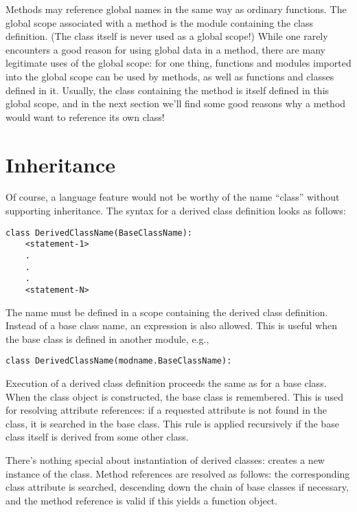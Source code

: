 \documentclass{manual}
\begin{document}
Methods may reference global names in the same way as ordinary
functions.  The global scope associated with a method is the module
containing the class definition.  (The class itself is never used as a
global scope!)  While one rarely encounters a good reason for using
global data in a method, there are many legitimate uses of the global
scope: for one thing, functions and modules imported into the global
scope can be used by methods, as well as functions and classes defined
in it.  Usually, the class containing the method is itself defined in
this global scope, and in the next section we'll find some good
reasons why a method would want to reference its own class!


\section{Inheritance}
\label{inheritance}

Of course, a language feature would not be worthy of the name ``class''
without supporting inheritance.  The syntax for a derived class
definition looks as follows:

\begin{verbatim}
class DerivedClassName(BaseClassName):
    <statement-1>
    .
    .
    .
    <statement-N>
\end{verbatim}

The name  must be defined in a scope containing
the derived class definition.  Instead of a base class name, an
expression is also allowed.  This is useful when the base class is
defined in another module, e.g.,

\begin{verbatim}
class DerivedClassName(modname.BaseClassName):
\end{verbatim}

Execution of a derived class definition proceeds the same as for a
base class.  When the class object is constructed, the base class is
remembered.  This is used for resolving attribute references: if a
requested attribute is not found in the class, it is searched in the
base class.  This rule is applied recursively if the base class itself
is derived from some other class.

There's nothing special about instantiation of derived classes:
 creates a new instance of the class.  Method
references are resolved as follows: the corresponding class attribute
is searched, descending down the chain of base classes if necessary,
and the method reference is valid if this yields a function object.
\end{document}

